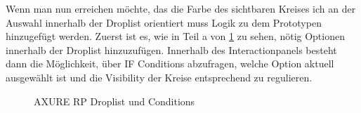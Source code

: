 Wenn man nun erreichen möchte, das die Farbe des sichtbaren Kreises ich an der Auswahl innerhalb der Droplist orientiert muss Logik zu dem Prototypen hinzugefügt werden.
Zuerst ist es, wie in Teil a von \cref{fig:Droplist} zu sehen, nötig Optionen innerhalb der Droplist hinzuzufügen.
Innerhalb des Interactionpanels besteht dann die Möglichkeit, über IF Conditions abzufragen, welche Option aktuell ausgewählt ist und die Visibility der Kreise entsprechend zu regulieren.

\begin{figure}%
\centering
{}%
\qquad
{}%

\caption{AXURE RP Droplist und Conditions}%
\label{fig:Droplist}
\end{figure}

